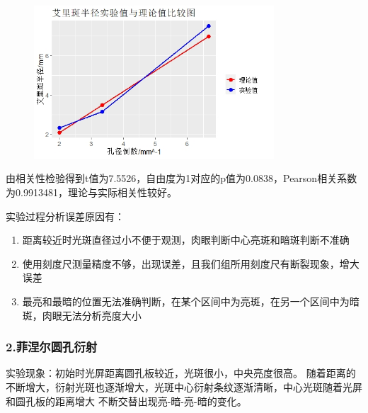 \documentclass[12pt,a4paper,UTF8]{ctexart}
\begin{document}
  \begin{table}[htbp]
	\centering
	  \caption{艾里斑半径实验值与理论值比较}
	\label{tab:2}%
  \end{table}

  \begin{figure}[htbp]
	\centering
	\includegraphics[width=0.8\textwidth]{img//plot.jpeg}
	\label{fig:1}
\end{figure}

由相关性检验得到t值为7.5526，自由度为1对应的p值为0.0838，Pearson相关系数为0.9913481，理论与实际相关性较好。

实验过程分析误差原因有：
\begin{enumerate}
	\item 距离较近时光斑直径过小不便于观测，肉眼判断中心亮斑和暗斑判断不准确
	\item 使用刻度尺测量精度不够，出现误差，且我们组所用刻度尺有断裂现象，增大误差
	\item 最亮和最暗的位置无法准确判断，在某个区间中为亮斑，在另一个区间中为暗斑，肉眼无法分析亮度大小
\end{enumerate}

\subsubsection*{2.菲涅尔圆孔衍射}
实验现象：初始时光屏距离圆孔板较近，光斑很小，中央亮度很高。
随着距离的不断增大，衍射光斑也逐渐增大，光斑中心衍射条纹逐渐清晰，中心光斑随着光屏和圆孔板的距离增大
不断交替出现亮-暗-亮-暗的变化。
\end{document}
